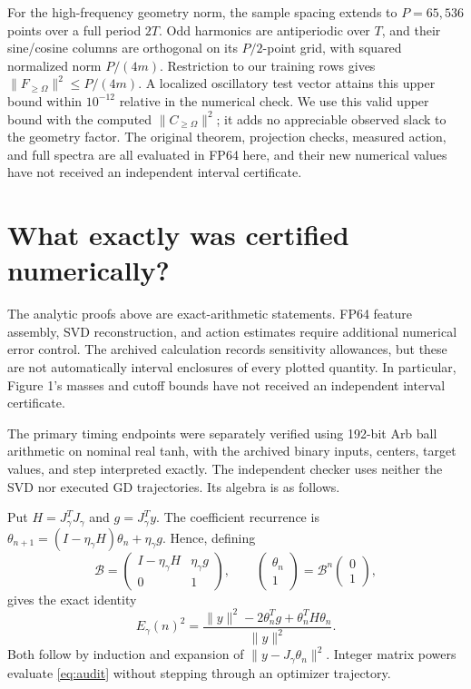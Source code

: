 \documentclass[11pt]{article}
\theoremstyle{definition}
\begin{document}
For the high-frequency geometry norm, the sample spacing extends to
$P=65{,}536$ points over a full period $2T$. Odd harmonics are antiperiodic
over $T$, and their sine/cosine columns are orthogonal on its $P/2$-point
grid, with squared normalized norm $P/(4m)$. Restriction to our training
rows gives $\|F_{\ge\Omega}\|^2\le P/(4m)$. A localized oscillatory test
vector attains this upper bound within $10^{-12}$ relative in the numerical
check. We use this valid upper bound with the computed
$\|C_{\ge\Omega}\|^2$; it adds no appreciable observed slack to the geometry
factor. The original theorem, projection checks, measured action, and full
spectra are all evaluated in FP64 here, and their new numerical values have
not received an independent interval certificate.

\section{What exactly was certified numerically?}
The analytic proofs above are exact-arithmetic statements. FP64 feature
assembly, SVD reconstruction, and action estimates require additional numerical
error control. The archived calculation records sensitivity allowances, but
these are not automatically interval enclosures of every plotted quantity.
In particular, Figure 1's masses and cutoff bounds have not received an
independent interval certificate.

The primary timing endpoints were separately verified using 192-bit Arb ball
arithmetic on nominal real tanh, with the archived binary inputs, centers,
target values, and step interpreted exactly. The independent checker uses
neither the SVD nor executed GD trajectories. Its algebra is as follows.

Put $H=J_\gamma^TJ_\gamma$ and $g=J_\gamma^Ty$. The coefficient recurrence is
$\theta_{n+1}=(I-\eta_\gamma H)\theta_n+\eta_\gamma g$. Hence, defining
\begin{equation*}
 \mathcal B=\begin{pmatrix}I-\eta_\gamma H&\eta_\gamma g\\0&1\end{pmatrix},
 \qquad \begin{pmatrix}\theta_n\\1\end{pmatrix}
 =\mathcal B^n\begin{pmatrix}0\\1\end{pmatrix},
\end{equation*}
gives the exact identity
\begin{equation}\label{eq:audit}
 E_\gamma(n)^2=
 \frac{\|y\|^2-2\theta_n^Tg+\theta_n^TH\theta_n}{\|y\|^2}.
\end{equation}
Both follow by induction and expansion of $\|y-J_\gamma\theta_n\|^2$.
Integer matrix powers evaluate \eqref{eq:audit} without stepping through an
optimizer trajectory.
\end{document}
